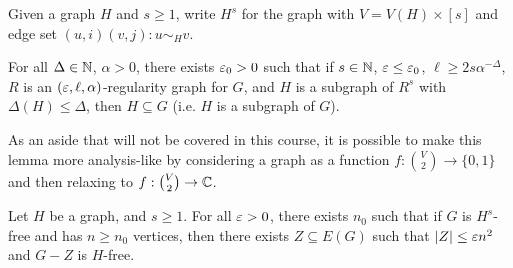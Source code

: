 \documentclass[main.tex]{subfiles}
\begin{document}
Given a graph $H$ and $s\geq 1$, write $H^s$ for the graph with
$V = V(H)\times[s]$ and edge set $(u,i)(v,j) : u\sim_H v$.
\begin{lemma}
  \th\label{lem:blowup}
  For all $\Delta\in\mathbb N$, $\alpha > 0$, there exists $\varepsilon_0 > 0$ such that
  if $s\in\mathbb N$, $\varepsilon\leq\varepsilon_0$, $\ell\geq 2s\alpha^{-\Delta}$, $R$ is an
  $(\varepsilon,\ell,\alpha)$-regularity graph for $G$, and $H$ is a subgraph of $R^s$
  with $\Delta(H)\leq\Delta$, then $H\subseteq G$ (i.e. $H$ is a subgraph of $G$).
\end{lemma}
As an aside that will not be covered in this course, it is possible to make this
lemma more analysis-like by considering a graph as a function
$f:\binom V 2\to\{0,1\}$ and then relaxing to $f:\binom V 2\to\mathbb C$.
\begin{lemma}
  Let $H$ be a graph, and $s\geq 1$.
  For all $\varepsilon > 0$, there exists $n_0$ such that if $G$ is $H^s$-free and has
  $n\geq n_0$ vertices, then there exists $Z\subseteq E(G)$ such that
  $|Z|\leq\varepsilon n^2$ and $G - Z$ is $H$-free.
\end{lemma}
\end{document}
